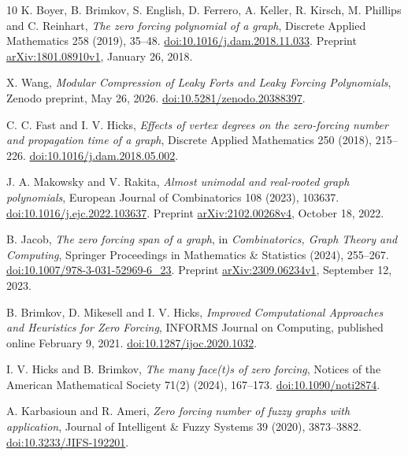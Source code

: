 \documentclass[11pt]{article}
\begin{document}
\begin{thebibliography}{10}
 K. Boyer, B. Brimkov, S. English, D. Ferrero, A. Keller,
R. Kirsch, M. Phillips and C. Reinhart,
\emph{The zero forcing polynomial of a graph},
Discrete Applied Mathematics 258 (2019), 35--48.
\href{https://doi.org/10.1016/j.dam.2018.11.033}{doi:10.1016/j.dam.2018.11.033}.
Preprint \href{https://arxiv.org/abs/1801.08910v1}{arXiv:1801.08910v1}, January 26, 2018.

 X. Wang,
\emph{Modular Compression of Leaky Forts and Leaky Forcing Polynomials},
Zenodo preprint, May 26, 2026.
\href{https://doi.org/10.5281/zenodo.20388397}{doi:10.5281/zenodo.20388397}.

 C. C. Fast and I. V. Hicks,
\emph{Effects of vertex degrees on the zero-forcing number and propagation
 time of a graph}, Discrete Applied Mathematics 250 (2018), 215--226.
\href{https://doi.org/10.1016/j.dam.2018.05.002}{doi:10.1016/j.dam.2018.05.002}.

 J. A. Makowsky and V. Rakita,
\emph{Almost unimodal and real-rooted graph polynomials},
European Journal of Combinatorics 108 (2023), 103637.
\href{https://doi.org/10.1016/j.ejc.2022.103637}{doi:10.1016/j.ejc.2022.103637}.
Preprint \href{https://arxiv.org/abs/2102.00268v4}{arXiv:2102.00268v4}, October 18, 2022.

 B. Jacob, \emph{The zero forcing span of a graph},
in \emph{Combinatorics, Graph Theory and Computing}, Springer Proceedings
in Mathematics \& Statistics (2024), 255--267.
\href{https://doi.org/10.1007/978-3-031-52969-6_23}{doi:10.1007/978-3-031-52969-6\_23}.
Preprint \href{https://arxiv.org/abs/2309.06234v1}{arXiv:2309.06234v1}, September 12, 2023.

 B. Brimkov, D. Mikesell and I. V. Hicks,
\emph{Improved Computational Approaches and Heuristics for Zero Forcing},
INFORMS Journal on Computing, published online February 9, 2021.
\href{https://doi.org/10.1287/ijoc.2020.1032}{doi:10.1287/ijoc.2020.1032}.

 I. V. Hicks and B. Brimkov,
\emph{The many face(t)s of zero forcing},
Notices of the American Mathematical Society 71(2) (2024), 167--173.
\href{https://doi.org/10.1090/noti2874}{doi:10.1090/noti2874}.

 A. Karbasioun and R. Ameri,
\emph{Zero forcing number of fuzzy graphs with application},
Journal of Intelligent \& Fuzzy Systems 39 (2020), 3873--3882.
\href{https://doi.org/10.3233/JIFS-192201}{doi:10.3233/JIFS-192201}.


\end{thebibliography}
\end{document}
